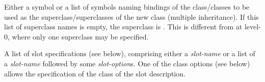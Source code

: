 %
\begin{optDefinition}
\label{defclass-1}
%
\Syntax
\label{defclass-syntax}
%
\begin{arguments}
    \item[\scref{superclass-names}] Either a symbol or a list of symbols naming
    bindings of the class/classes to be used as the superclass/superclasses of
    the new class (multiple
    inheritance).  If this list of superclass names is empty, the
    superclass is .  This is different from 
    at level-0, where only one superclass may be specified.

    \item[\scref{slot-1}] A list of slot specifications (see
    below), comprising either a {\em slot-name} or a list of a {\em slot-name}
    followed by some {\em slot-option}s.  One of the class options (see below)
    allows the specification of the class of the slot description.


\end{arguments}
\end{optDefinition}

